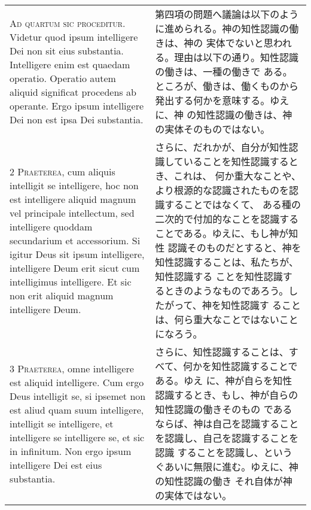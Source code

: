 \documentclass[10pt]{jsarticle} %
\begin{document}
\begin{longtable}{p{21em}p{21em}}

{\huge A}{\scshape d quartum sic proceditur}. Videtur quod
ipsum intelligere Dei non sit eius substantia. Intelligere enim est
quaedam operatio. Operatio autem aliquid significat procedens ab
operante. Ergo ipsum intelligere Dei non est ipsa Dei substantia.

&

第四項の問題へ議論は以下のように進められる。神の知性認識の働きは、神の
実体でないと思われる。理由は以下の通り。知性認識の働きは、一種の働きで
ある。ところが、働きは、働くものから発出する何かを意味する。ゆえに、神
の知性認識の働きは、神の実体そのものではない。


\\


{\scshape 2 Praeterea}, cum aliquis intelligit se
intelligere, hoc non est intelligere aliquid magnum vel principale
intellectum, sed intelligere quoddam secundarium et accessorium. Si
igitur Deus sit ipsum intelligere, intelligere Deum erit sicut cum
intelligimus intelligere. Et sic non erit aliquid magnum intelligere
Deum.

&

さらに、だれかが、自分が知性認識していることを知性認識するとき、これは、
何か重大なことや、より根源的な認識されたものを認識することではなくて、
ある種の二次的で付加的なことを認識することである。ゆえに、もし神が知性
認識そのものだとすると、神を知性認識することは、私たちが、知性認識する
ことを知性認識するときのようなものであろう。したがって、神を知性認識す
ることは、何ら重大なことではないことになろう。


\\


{\scshape 3 Praeterea}, omne intelligere est aliquid
intelligere. Cum ergo Deus intelligit se, si ipsemet non est aliud quam
suum intelligere, intelligit se intelligere, et intelligere se
intelligere se, et sic in infinitum. Non ergo ipsum intelligere Dei est
eius substantia.

&

さらに、知性認識することは、すべて、何かを知性認識することである。ゆえ
に、神が自らを知性認識するとき、もし、神が自らの知性認識の働きそのもの
であるならば、神は自己を認識することを認識し、自己を認識することを認識
することを認識し、というぐあいに無限に進む。ゆえに、神の知性認識の働き
それ自体が神の実体ではない。


\end{longtable}
\end{document}
